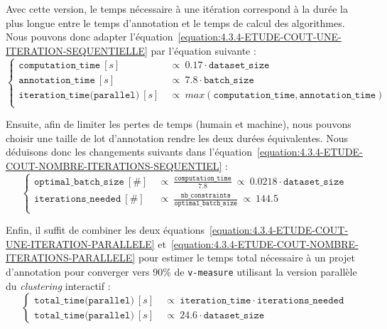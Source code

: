 			Avec cette version, le temps nécessaire à une itération correspond à la durée la plus longue entre le temps d'annotation et le temps de calcul des algorithmes.
			Nous pouvons donc adapter l'équation~\ref{equation:4.3.4-ETUDE-COUT-UNE-ITERATION-SEQUENTIELLE} par l'équation suivante :
			\begin{equation}
				\label{equation:4.3.4-ETUDE-COUT-UNE-ITERATION-PARALLELE}
				\begin{cases}
					\texttt{computation\_time}~[s]&
						~\propto~0.17 \cdot \texttt{dataset\_size}\\
					\texttt{annotation\_time}~[s]&
						~\propto~7.8 \cdot \texttt{batch\_size} \\
					\texttt{iteration\_time(parallel)}~[s]&
						~\propto~max(\texttt{computation\_time}, \texttt{annotation\_time}) \\
				\end{cases}
			\end{equation}
			
			Ensuite, afin de limiter les pertes de temps (humain et machine), nous pouvons choisir une taille de lot d'annotation rendre les deux durées équivalentes.
			Nous déduisons donc les changements suivants dans l'équation~\ref{equation:4.3.4-ETUDE-COUT-NOMBRE-ITERATIONS-SEQUENTIEL} :
			\begin{equation}
				\label{equation:4.3.4-ETUDE-COUT-NOMBRE-ITERATIONS-PARALLELE}
				\begin{cases}
					\texttt{optimal\_batch\_size}~[\#]&
						~\propto~\frac{\texttt{computation\_time}}{7.8}
						~\propto~0.0218 \cdot \texttt{dataset\_size} \\
					\texttt{iterations\_needed}~[\#] &
						~\propto~\frac{\texttt{nb\_constraints}}{\texttt{optimal\_batch\_size}}
						~\propto~144.5 \\
				\end{cases}
			\end{equation}
			
			Enfin, il suffit de combiner les deux équations~\ref{equation:4.3.4-ETUDE-COUT-UNE-ITERATION-PARALLELE} et~\ref{equation:4.3.4-ETUDE-COUT-NOMBRE-ITERATIONS-PARALLELE} pour estimer le temps total nécessaire à un projet d'annotation pour converger vers $90$\% de \texttt{v-measure} utilisant la version parallèle du \textit{clustering} interactif :
			\begin{equation}
				\label{equation:4.3.4-ETUDE-COUT-TOTAL-PARALLELE}
				\begin{cases}
					\texttt{total\_time(parallel)}~[s] &
						~\propto~\texttt{iteration\_time} \cdot \texttt{iterations\_needed} \\
					\texttt{total\_time(parallel)}~[s] &
						~\propto~24.6 \cdot \texttt{dataset\_size}
				\end{cases}
			\end{equation}
			
